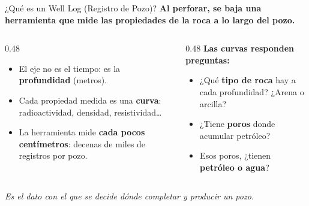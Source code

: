 \documentclass[aspectratio=169, 11pt]{beamer}
\begin{document}
\begin{frame}{¿Qué es un Well Log (Registro de Pozo)?}
  \vspace{-6pt}
  {\small\color{arcaDark}\bfseries
    Al perforar, se baja una herramienta que mide las propiedades de la roca a lo largo del pozo.}

  \vspace{8pt}
  \begin{columns}[T]
    \begin{column}{0.48\textwidth}
      {\footnotesize\color{textMuted}
      \begin{itemize}\setlength{\itemsep}{6pt}
        \item[{\color{arcaRed}\scriptsize\faArrowDown}]
          El eje no es el tiempo: es la
          \textbf{profundidad} (metros).
        \item[{\color{arcaRed}\scriptsize\faChartLine}]
          Cada propiedad medida es una \textbf{curva}:
          radioactividad, densidad, resistividad\ldots
        \item[{\color{arcaRed}\scriptsize\faMicrochip}]
          La herramienta mide \textbf{cada pocos
          centímetros}: decenas de miles de registros
          por pozo.
      \end{itemize}
      }
    \end{column}

    \begin{column}{0.48\textwidth}
      {\footnotesize\color{arcaDark}\bfseries Las curvas responden preguntas:}
      \vspace{4pt}
      {\footnotesize\color{textMuted}
      \begin{itemize}\setlength{\itemsep}{6pt}
        \item[{\color{arcaRed}\scriptsize\faQuestion}]
          ¿Qué \textbf{tipo de roca} hay a cada
          profundidad? ¿Arena o arcilla?
        \item[{\color{arcaRed}\scriptsize\faQuestion}]
          ¿Tiene \textbf{poros} donde acumular
          petróleo?
        \item[{\color{arcaRed}\scriptsize\faQuestion}]
          Esos poros, ¿tienen \textbf{petróleo
          o agua}?
      \end{itemize}
      }
    \end{column}
  \end{columns}

  \vspace{8pt}
  \centering
  {\footnotesize\color{arcaDark}\itshape
    Es el dato con el que se decide dónde completar y producir un pozo.}
\end{frame}
\end{document}
